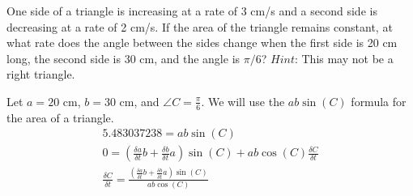 \documentclass[12pt]{exam}
\begin{document}
\begin{questions}
\clearpage
\question One side of a triangle is increasing at a rate of 3 cm/s and a second side is decreasing at a rate of 2 cm/s. If the area of the triangle remains constant, at what rate does the angle between the sides change when the first side is 20 cm long, the second side is 30 cm, and the angle is $\pi/6$? $Hint$: This may not be a right triangle.
	\begin{solution}
		Let $a=20$ cm, $b = 30$ cm, and $\angle C=\frac{\pi}{6}$. We will use the $ab\sin(C)$ formula for the area of a triangle.
		\begin{gather*}
			5.483037238 = ab\sin(C) \\
			0 = (\frac{\delta a}{\delta t}b + \frac{\delta b}{\delta t}a)\sin(C)+ab\cos(C)\frac{\delta C}{\delta t}\\
			\frac{\delta C}{\delta t} = \frac{(\frac{\delta a}{\delta t}b + \frac{\delta b}{\delta t}a)\sin(C)}{ab\cos(C)} \\

\end{gather*}
\end{solution}
\end{questions}
\end{document}
